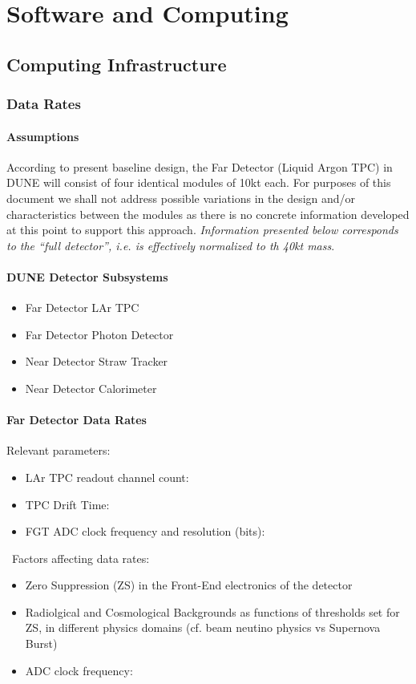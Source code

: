 \chapter{Software and Computing}
\label{ch:detectors-sc}

\section{Computing Infrastructure}
\label{sec:detectors-sc-infrastructure}

\subsection{Data Rates}
\label{sec:detectors-sc-infrastructure-data-rates}

\subsubsection{Assumptions}
According to present baseline design, the Far Detector (Liquid Argon TPC) in DUNE will consist of four identical modules of 10kt each.
For purposes of this document we shall not address possible variations in the design and/or characteristics between
the modules as there is no concrete information developed at this point to support this approach.
\textit{Information presented below corresponds to the ``full detector'', i.e. is effectively normalized to th 40kt mass}.

\subsubsection{DUNE Detector Subsystems}
\begin{itemize}
\item Far Detector LAr TPC
\item Far Detector Photon Detector
\item Near Detector Straw Tracker
\item Near Detector Calorimeter
\end{itemize}

\subsubsection{Far Detector Data Rates}
Relevant parameters:
\begin{itemize}
\item LAr TPC readout channel count:
\item TPC Drift Time:
\item FGT ADC clock frequency and resolution (bits):
\end{itemize}
\
Factors affecting data rates:
\begin{itemize}
\item Zero Suppression (ZS)  in the Front-End electronics of the detector
\item Radiolgical and Cosmological Backgrounds as functions of thresholds set for ZS, in different physics domains (cf. beam neutino physics vs Supernova Burst)
\item ADC clock frequency:
\end{itemize}


